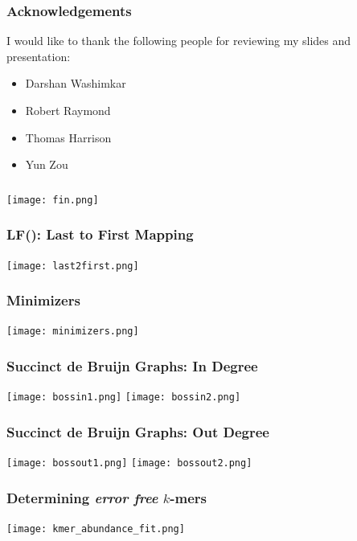 \documentclass{beamer}
\begin{document}
\begin{frame}
\frametitle{Acknowledgements}
I would like to thank the following people for reviewing my slides and presentation:
\begin{itemize}
  \item Darshan Washimkar
  \item Robert Raymond
  \item Thomas Harrison
  \item Yun Zou
\end{itemize}
\end{frame}

\begin{frame}
\frametitle{}

\texttt{[image: fin.png]}

% 
\end{frame}

\begin{frame}
\frametitle{LF(): Last to First Mapping}

\texttt{[image: last2first.png]}

% 
\end{frame}

\begin{frame}
\frametitle{Minimizers}

\texttt{[image: minimizers.png]}

\end{frame}

\begin{frame}
\frametitle{Succinct de Bruijn Graphs: In Degree}

\texttt{[image: bossin1.png]}
\texttt{[image: bossin2.png]}


% 
\end{frame}

\begin{frame}
\frametitle{Succinct de Bruijn Graphs: Out Degree}

\texttt{[image: bossout1.png]}
\texttt{[image: bossout2.png]}


% 
\end{frame}

\begin{frame}
\frametitle{Determining \emph{error free} $k$-mers}

\texttt{[image: kmer\_abundance\_fit.png]}

\end{frame}
\end{document}
